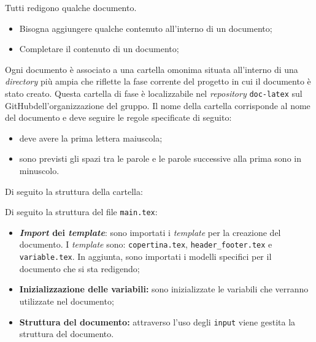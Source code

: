 \label{redazione-documento}

Tutti redigono qualche documento.

\begin{itemize}
	\item Bisogna aggiungere qualche contenuto all'interno di un documento;
\end{itemize}

\begin{itemize}
	\item Completare il contenuto di un documento;
\end{itemize}

Ogni documento è associato a una cartella omonima situata all'interno di una
\textit{directory} più ampia che riflette la fase corrente del progetto in cui
il documento è stato creato.
Questa cartella di fase è localizzabile nel \textit{repository\g}
\texttt{doc-latex} sul GitHub\g dell'organizzazione del gruppo.
Il nome della cartella corrisponde al nome del documento e deve seguire le
regole specificate di seguito:
\begin{itemize}
	\item deve avere la prima lettera maiuscola;
	\item sono previsti gli spazi tra le parole e le parole successive alla
	      prima sono in minuscolo.
\end{itemize}

Di seguito la struttura della cartella:

\vspace{0.5cm}


Di seguito la struttura del file \texttt{main.tex}:
\begin{itemize}
	\item \textbf{\textit{Import} dei \textit{template}}: sono importati i \textit{template} per la
	      creazione del documento. I \textit{template} sono: \texttt{copertina.tex},
	      \texttt{header\_footer.tex} e \texttt{variable.tex}. In aggiunta, sono
	      importati i modelli specifici per il documento che si sta redigendo;

	\item \textbf{Inizializzazione delle variabili:} sono inizializzate le
	      variabili che verranno utilizzate nel documento;

	\item \textbf{Struttura del documento:} attraverso l'uso degli
	      \texttt{input} viene gestita la struttura del documento.
\end{itemize}

